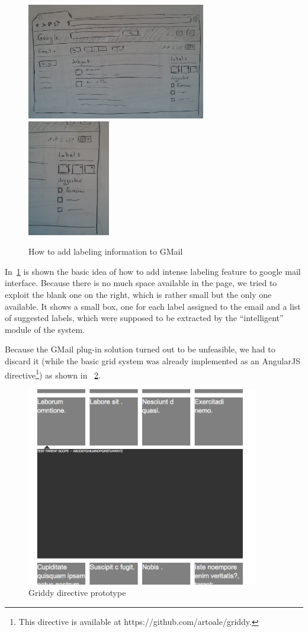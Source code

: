 \documentclass[a4paper,12pt]{report}
\begin{document}
\begin{figure}[H]
  \centering
  \includegraphics[height=2in]{old_label}
  \includegraphics[height=2in]{old_label_detail}
  \caption{How to add labeling information to GMail}
  \label{fig:old2}
\end{figure}
In~\ref{fig:old2} is shown the basic idea of how to add intense labeling feature to google mail interface. Because there is no much space available in the page, we tried to exploit the blank one on the right, which is rather small but the only one available. It shows a small box, one for each label assigned to the email and a list of suggested labels, which were supposed to be extracted by the ``intelligent'' module of the system.

Because the GMail plug-in solution turned out to be unfeasible, we had to discard it (while the basic grid system was already implemented as an AngularJS directive\footnote{This directive is available at https://github.com/artoale/griddy.}) as shown in ~\ref{fig:griddy}.
\begin{figure}[H]
  \centering
  \includegraphics[width=4in]{griddy}
  \caption{Griddy directive prototype}
  \label{fig:griddy}
\end{figure}
\end{document}

